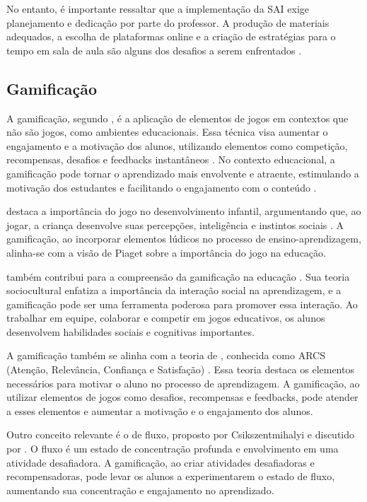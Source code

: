 No entanto, é importante ressaltar que a implementação da SAI exige planejamento e dedicação por parte do professor. A produção de materiais adequados, a escolha de plataformas online e a criação de estratégias para o tempo em sala de aula são alguns dos desafios a serem enfrentados \cite{Rodrigues_2020}.
\subsection{Gamificação}

A gamificação, segundo \cite{busarello2014gamificacao}, é a aplicação de elementos de jogos em contextos que não são jogos, como ambientes educacionais. Essa técnica visa aumentar o engajamento e a motivação dos alunos, utilizando elementos como competição, recompensas, desafios e feedbacks instantâneos . No contexto educacional, a gamificação pode tornar o aprendizado mais envolvente e atraente, estimulando a motivação dos estudantes e facilitando o engajamento com o conteúdo \cite{goncalves2021modelo}.

\cite{piaget1993formacao} destaca a importância do jogo no desenvolvimento infantil, argumentando que, ao jogar, a criança desenvolve suas percepções, inteligência e instintos sociais . A gamificação, ao incorporar elementos lúdicos no processo de ensino-aprendizagem, alinha-se com a visão de Piaget sobre a importância do jogo na educação.

\cite{vigotsky2007formacao} também contribui para a compreensão da gamificação na educação . Sua teoria sociocultural enfatiza a importância da interação social na aprendizagem, e a gamificação pode ser uma ferramenta poderosa para promover essa interação. Ao trabalhar em equipe, colaborar e competir em jogos educativos, os alunos desenvolvem habilidades sociais e cognitivas importantes.

A gamificação também se alinha com a teoria de \cite{keller2017development}, conhecida como ARCS (Atenção, Relevância, Confiança e Satisfação) . Essa teoria destaca os elementos necessários para motivar o aluno no processo de aprendizagem. A gamificação, ao utilizar elementos de jogos como desafios, recompensas e feedbacks, pode atender a esses elementos e aumentar a motivação e o engajamento dos alunos.

Outro conceito relevante é o de fluxo, proposto por Csikszentmihalyi e discutido por \cite{hamari2014measuring}. O fluxo é um estado de concentração profunda e envolvimento em uma atividade desafiadora. A gamificação, ao criar atividades desafiadoras e recompensadoras, pode levar os alunos a experimentarem o estado de fluxo, aumentando sua concentração e engajamento no aprendizado.

